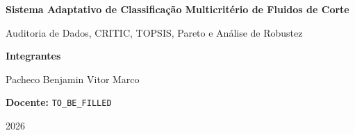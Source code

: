 \begin{frame}[plain]
\begin{center}
        {\LARGE\bfseries
        Sistema Adaptativo de Classificação Multicritério
        de Fluidos de Corte
        }

        \vspace{0.5cm}

        {\large
        Auditoria de Dados, CRITIC, TOPSIS, Pareto e
        Análise de Robustez
        }


        \vfill



        {\large
        \textbf{Integrantes}
        }

        \vspace{0.3cm}

        {\normalsize
        Pacheco
        \qquad
        Benjamin
        \qquad
        Vitor
        \qquad
        Marco
        }

        \vspace{0.6cm}



        {\normalsize
        \textbf{Docente:}
        \texttt{TO\_BE\_FILLED}
        }

        \vspace{0.5cm}



        {\normalsize
        2026
        }

        \vspace{0.3cm}

    \end{center}

\end{frame}


%
%
%
%
%


